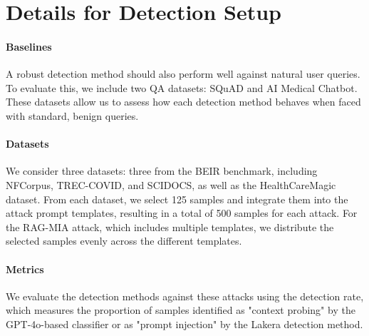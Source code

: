 \section{Details for Detection Setup}
\label{app:detection_setup}

\paragraph{Baselines} A robust detection method should also perform well against natural user queries. To evaluate this, we include two QA datasets: SQuAD and AI Medical Chatbot. These datasets allow us to assess how each detection method behaves when faced with standard, benign queries.

\paragraph{Datasets} We consider three datasets: three from the BEIR benchmark, including NFCorpus, TREC-COVID, and SCIDOCS, as well as the HealthCareMagic dataset. From each dataset, we select 125 samples and integrate them into the attack prompt templates, resulting in a total of 500 samples for each attack. For the RAG-MIA attack, which includes multiple templates, we distribute the selected samples evenly across the different templates.

\paragraph{Metrics} We evaluate the detection methods against these attacks using the detection rate, which measures the proportion of samples identified as "context probing" by the GPT-4o-based classifier or as "prompt injection" by the Lakera detection method. 
